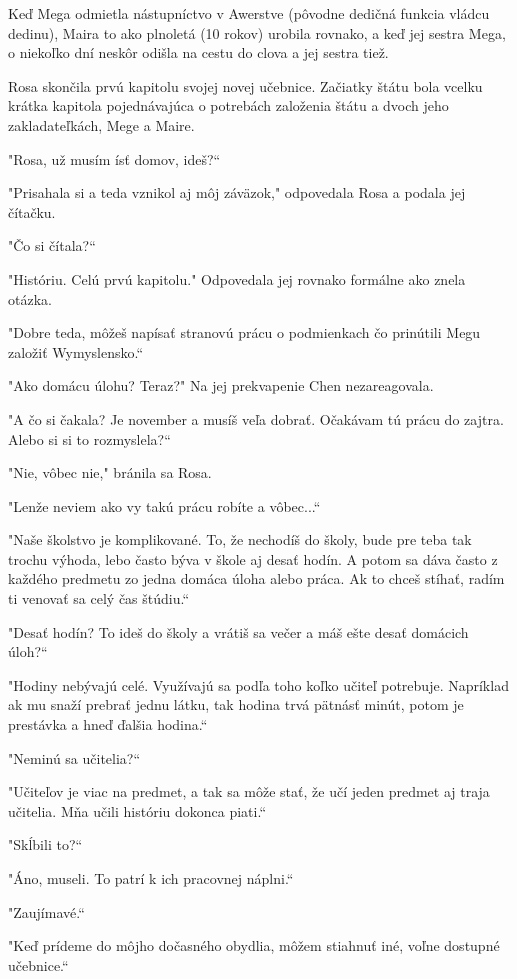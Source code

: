 \documentclass{book}
\begin{document}
Keď Mega odmietla nástupníctvo v Awerstve (pôvodne dedičná funkcia vládcu dedinu), Maira to ako plnoletá (10 rokov) urobila rovnako, a keď jej sestra Mega, o niekoľko dní neskôr odišla na cestu do clova a jej sestra tiež.

Rosa skončila prvú kapitolu svojej novej učebnice. Začiatky štátu bola vcelku krátka kapitola pojednávajúca o potrebách založenia štátu a dvoch jeho zakladateľkách, Mege a Maire.

"$ $Rosa, už musím ísť domov, ideš?“

"$ $Prisahala si a teda vznikol aj môj záväzok,"$ $ odpovedala Rosa a podala jej čítačku.

"$ $Čo si čítala?“

"$ $Históriu. Celú prvú kapitolu."$ $ Odpovedala jej rovnako formálne ako znela otázka.

"$ $Dobre teda, môžeš napísať stranovú prácu o podmienkach čo prinútili Megu založiť Wymyslensko.“

"$ $Ako domácu úlohu? Teraz?"$ $ Na jej prekvapenie Chen nezareagovala.

"$ $A čo si čakala? Je november a musíš veľa dobrať. Očakávam tú prácu do zajtra. Alebo si si to rozmyslela?“

"$ $Nie, vôbec nie,"$ $ bránila sa Rosa.

"$ $Lenže neviem ako vy takú prácu robíte a vôbec...“

"$ $Naše školstvo je komplikované. To, že nechodíš do školy, bude pre teba tak trochu výhoda, lebo často býva v škole aj desať hodín. A potom sa dáva často z každého predmetu zo jedna domáca úloha alebo práca. Ak to chceš stíhať, radím ti venovať sa celý čas štúdiu.“

"$ $Desať hodín? To ideš do školy a vrátiš sa večer a máš ešte desať domácich úloh?“

"$ $Hodiny nebývajú celé. Využívajú sa podľa toho koľko učiteľ potrebuje. Napríklad ak mu snaží prebrať jednu látku, tak hodina trvá pätnásť minút, potom je prestávka a hneď ďalšia hodina.“

"$ $Neminú sa učitelia?“

"$ $Učiteľov je viac na predmet, a tak sa môže stať, že učí jeden predmet aj traja učitelia. Mňa učili históriu dokonca piati.“

"$ $Skĺbili to?“

"$ $Áno, museli. To patrí k ich pracovnej náplni.“

"$ $Zaujímavé.“

"$ $Keď prídeme do môjho dočasného obydlia, môžem stiahnuť iné, voľne dostupné učebnice.“
\end{document}
